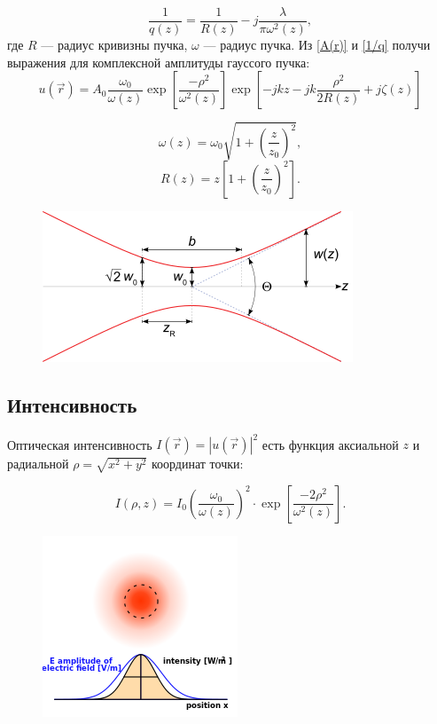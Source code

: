 \documentclass[a4paper,14pt]{extarticle}
\begin{document}
	\begin{equation}
		\frac{1}{q(z)} = \frac{1}{R(z)} - j \frac{\lambda}{\pi \omega^2(z)},
		\label{1/q}
	\end{equation}
	где $R$ --- радиус кривизны пучка, $\omega$ --- радиус пучка. Из \eqref{A(r)} и \eqref{1/q} получи выражения для комплексной амплитуды гауссого пучка: 
	\begin{equation}
		\boxed{u(\vec{r} ) = A_0 \frac{\omega_0}{\omega(z)} \exp \left[ \frac{-\rho^2}{\omega^2(z)}\right] \exp \left[ -jkz -jk \frac{\rho^2}{2R(z)}+ j \zeta(z) \right]}
	\end{equation}
	
	\begin{equation}
		\omega(z) = \omega_0 \sqrt{1 + \left(\frac{z}{z_0}\right)^2},
		\label{w(z)}
	\end{equation}
		\begin{equation}
			R(z) = z \left[1 + \left( \frac{z}{z_0}\right)^2 \right].
		\end{equation}
	\begin{figure}[H]
		\includegraphics[scale=1]{beam}
	\end{figure}
 
	\subsection{Интенсивность}
	Оптическая интенсивность $I(\vec{r})= |u(\vec{r})|^2$ есть функция аксиальной $z$  и радиальной  $\rho = \sqrt{x^2 + y^2}$ координат точки: 

\begin{equation}
	I(\rho, z) = I_0 \left( \frac{\omega_0}{\omega(z)} \right)^2  \cdot \exp \left[ \frac{-2 \rho^2}{\omega^2(z)} \right].
	\label{I}
\end{equation}
	
	\begin{figure}[H]
		\includegraphics[scale=0.9]{I}
	\end{figure}
\end{document}
